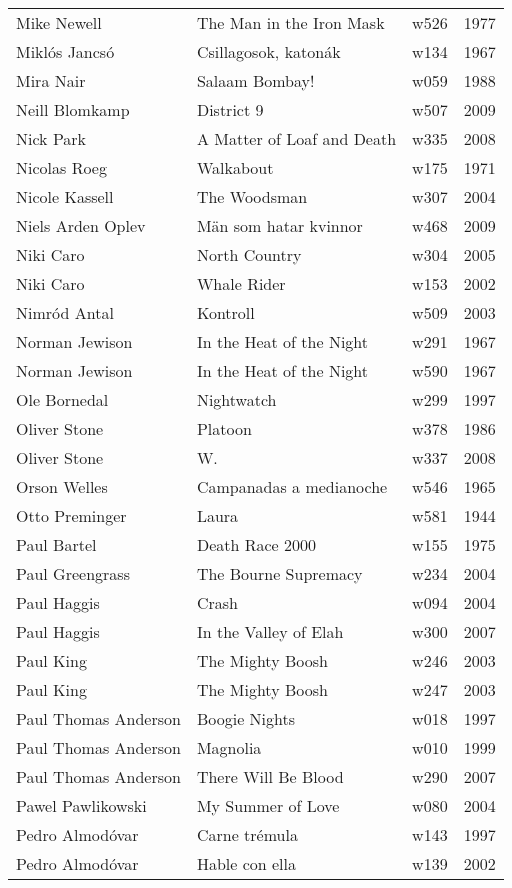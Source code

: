 \documentclass{article}
\begin{document}
\begin {center}
\begin{longtable}{l p{10cm} l l}
Mike Newell & The Man in the Iron Mask & w526 & 1977 \\
Miklós Jancsó & Csillagosok, katonák & w134 & 1967 \\
Mira Nair & Salaam Bombay! & w059 & 1988 \\
Neill Blomkamp & District 9 & w507 & 2009 \\
Nick Park & A Matter of Loaf and Death & w335 & 2008 \\
Nicolas Roeg & Walkabout & w175 & 1971 \\
Nicole Kassell & The Woodsman & w307 & 2004 \\
Niels Arden Oplev & Män som hatar kvinnor & w468 & 2009 \\
Niki Caro & North Country & w304 & 2005 \\
Niki Caro & Whale Rider & w153 & 2002 \\
Nimród Antal & Kontroll & w509 & 2003 \\
Norman Jewison & In the Heat of the Night & w291 & 1967 \\
Norman Jewison & In the Heat of the Night & w590 & 1967 \\
Ole Bornedal & Nightwatch & w299 & 1997 \\
Oliver Stone & Platoon & w378 & 1986 \\
Oliver Stone & W. & w337 & 2008 \\
Orson Welles & Campanadas a medianoche & w546 & 1965 \\
Otto Preminger & Laura & w581 & 1944 \\
Paul Bartel & Death Race 2000 & w155 & 1975 \\
Paul Greengrass & The Bourne Supremacy & w234 & 2004 \\
Paul Haggis & Crash & w094 & 2004 \\
Paul Haggis & In the Valley of Elah & w300 & 2007 \\
Paul King & The Mighty Boosh & w246 & 2003 \\
Paul King & The Mighty Boosh & w247 & 2003 \\
Paul Thomas Anderson & Boogie Nights & w018 & 1997 \\
Paul Thomas Anderson & Magnolia & w010 & 1999 \\
Paul Thomas Anderson & There Will Be Blood & w290 & 2007 \\
Pawel Pawlikowski & My Summer of Love & w080 & 2004 \\
Pedro Almodóvar & Carne trémula & w143 & 1997 \\
Pedro Almodóvar & Hable con ella & w139 & 2002 \\

\end{longtable}
\end{center}
\end{document}
